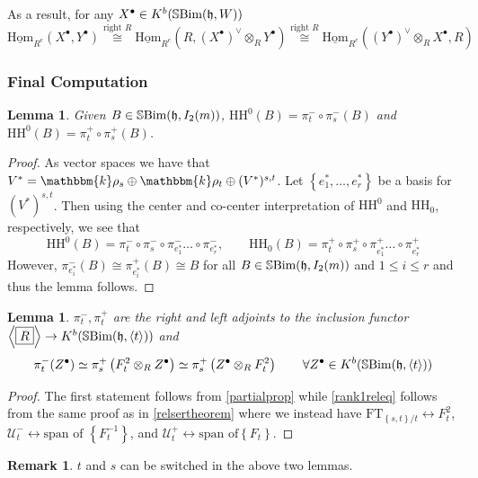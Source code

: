 \documentclass[10pt]{article}
\numberwithin{theorem}{section}
\newtheorem{lemma}[theorem]{Lemma}
\theoremstyle{definition}
\newtheorem*{remark}{Remark}
\newcommand{\kb}{\mathbbm{k}}
\newcommand{\uhom}{\underline{\mathrm{Hom}}}
\newcommand{\Uc}{\mathcal{U}}
\newcommand{\hf}{\mathfrak{h}}
\newcommand{\sbim}{\mathbb{S}\textnormal{Bim}}
\newcommand{\abrac}[1]{\left\langle#1\right\rangle}
\newcommand{\paren}[1]{\left( #1 \right)}
\newcommand{\set}[1]{\left \{ #1 \right \}}
\newcommand{\hh}{\mathrm{HH}}
\newcommand{\ft}{\mathrm{FT}}
\newcommand{\xcong}[1]{\overset{#1}{\cong}}
\newcommand{\0}{\ \raisebox{-2ex}{\begin{tikzpicture}[xscale=0.25,yscale=0.3,thick,baseline]
 \draw (0,0) -- (0,3); 
\end{tikzpicture}}}
\renewcommand{\1}{\ \raisebox{-2ex}{\begin{tikzpicture}[xscale=0.25,yscale=0.3,thick,baseline]
 \draw (0,0) -- (0,1);
 \draw (0,2) -- (0,3);
 \node[dot] at (0,1) {};
  \node[dot] at (0,2) {};
\end{tikzpicture}}}
\begin{document}
As a result, for any $X^\bullet\in K^b(\sbim(\hf, W))$ 
\[ \uhom_{R^e}(X^\bullet, Y^\bullet)\xcong{\text{right }R} \uhom_{R^e}(R, (X^\bullet)^\vee \otimes_R Y^\bullet)\xcong{\text{right }R} \uhom_{R^e}(  (Y^\bullet)^\vee \otimes_R X^\bullet, R ) \]

\subsubsection{Final Computation}



\begin{lemma}
    Given $B\in \sbim(\hf, I_2(m))$, $\hh^0(B)=\pi^-_t \circ \pi^-_s (B)$ and  $\hh^0(B)=\pi^+_t \circ \pi^+_s (B)$.
\end{lemma}
\begin{proof}
    As vector spaces we have that $V^*=\kb \rho_s \oplus \kb \rho_t \oplus (V^*)^{s,t}$. Let $\set{e_1^*, \ldots, e_r^*}$ be a basis for $(V^*)^{s,t}$. Then using the center and co-center interpretation of $\hh^0$ and $\hh_0$, respectively, we see that 
    \[  \hh^0(B)= \pi^-_t \circ \pi^-_s \circ \pi^-_{e_1^*}\ldots \circ \pi^-_{e_r^*}, \qquad \hh_0(B)= \pi^+_t \circ \pi^+_s \circ \pi^+_{e_1^*}\ldots \circ \pi^+_{e_r^*}  \]
    However, $\pi^-_{e_i^*}(B)\cong  \pi^+_{e_i^*}(B)\cong B$ for all $B\in\sbim(\hf, I_2(m)) $ and $1\le i \le r$ and thus the lemma follows. 
\end{proof}

\begin{lemma}
  $\pi^-_t, \pi^{+}_t $ are the right and left adjoints to the inclusion functor $\abrac{\boxed{R}}\to K^b(\sbim(\hf, \abrac{t}))$ and 
  \begin{equation}
  \label{rank1releq}
       \pi_t^-(Z^\bullet)\simeq    \pi_s^+\paren{F_t^2\otimes_R Z^\bullet} \simeq \pi_s^+\paren{Z^\bullet\otimes_R F_t^2}  \qquad \forall Z^\bullet \in K^b(\sbim(\hf, \abrac{t}))
  \end{equation}
\end{lemma}
\begin{proof}
   The first statement follows from \cref{partialprop} while \cref{rank1releq} follows from the same proof as in \cref{relsertheorem} where we instead have $\ft_{\set{s,t}/t}\longleftrightarrow F_t^2$, $\Uc^-_t\longleftrightarrow \text{span of } \set{F_t^{-1}}$, and $\Uc^+_t\longleftrightarrow \text{span of}  \set{F_t}$.
\end{proof}

\begin{remark}
    $t$ and $s$ can be switched in the above two lemmas.
\end{remark}
\end{document}
